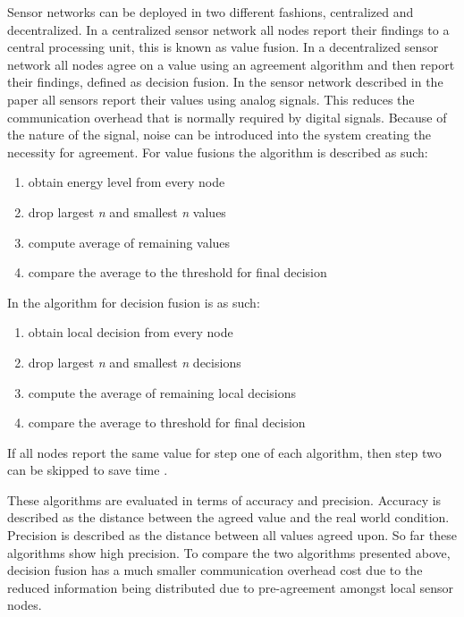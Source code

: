\documentclass[twoside, conference]{IEEEtran}
\begin{document}
Sensor networks can be deployed in two different fashions, centralized and decentralized. In a centralized sensor network all nodes report their findings to a central processing unit, this is known as value fusion. In a decentralized sensor network all nodes agree on a value using an agreement algorithm and then report their findings, defined as decision fusion. In the sensor network described in the paper all sensors report their values using analog signals. This reduces the communication overhead that is normally required by digital signals. Because of the nature of the signal, noise can be introduced into the system creating the necessity for agreement. For value fusions the algorithm is described as such:
\begin{enumerate}
	\item obtain energy level from every node
	\item drop largest \textit{n} and smallest \textit{n} values
	\item compute average of remaining values
	\item compare the average to the threshold for final decision
\end{enumerate}
In \cite{clouqueur2004} the algorithm for decision fusion is as such:
\begin{enumerate}
	\item obtain local decision from every node
	\item drop largest \textit{n} and smallest \textit{n} decisions
	\item compute the average of remaining local decisions
	\item compare the average to threshold for final decision
\end{enumerate}
If all nodes report the same value for step one of each algorithm, then step two can be skipped to save time \cite{clouqueur2004}.

These algorithms are evaluated in terms of accuracy and precision. Accuracy is described as the distance between the agreed value and the real world condition. Precision is described as the distance between all values agreed upon. So far these algorithms show high precision. To compare the two algorithms presented above, decision fusion has a much smaller communication overhead cost due to the reduced information being distributed due to pre-agreement amongst local sensor nodes. 

\end{document}
